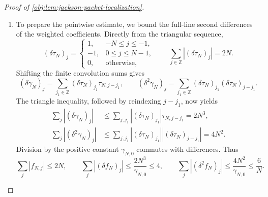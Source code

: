 \begin{proof}[Proof of \cref{obj:lem:jackson-packet-localization}]
\begin{enumerate}
\item To prepare the pointwise estimate, we bound the full-line second differences of the weighted coefficients. Directly from the triangular sequence,
\[
(\delta\tau_N)_j=
\begin{cases}
1,&-N\leq j\leq-1,\\
-1,&0\leq j\leq N-1,\\
0,&\text{otherwise},
\end{cases}
\qquad
\sum_{j\in\mathbb Z}|(\delta\tau_N)_j|=2N.
\]
Shifting the finite convolution sums gives
\[
(\delta\gamma_N)_j
=\sum_{j_1\in\mathbb Z}
(\delta\tau_N)_{j_1}\tau_{N,j-j_1},
\qquad
(\delta^2\gamma_N)_j
=\sum_{j_1\in\mathbb Z}
(\delta\tau_N)_{j_1}(\delta\tau_N)_{j-j_1}.
\]
The triangle inequality, followed by reindexing \(j-j_1\), now yields
\[
\begin{aligned}
\sum_j|(\delta\gamma_N)_j|
&\leq
\sum_{j,j_1}|(\delta\tau_N)_{j_1}|\tau_{N,j-j_1}
=2N^3,\\
\sum_j|(\delta^2\gamma_N)_j|
&\leq
\sum_{j,j_1}|(\delta\tau_N)_{j_1}|
                 |(\delta\tau_N)_{j-j_1}|
=4N^2.
\end{aligned}
\]
Division by the positive constant \(\gamma_{N,0}\) commutes with differences. Thus
\[
\sum_j|f_{N,j}|\leq2N,\qquad
\sum_j|(\delta f_N)_j|
\leq\frac{2N^3}{\gamma_{N,0}}\leq4,\qquad
\sum_j|(\delta^2f_N)_j|
\leq\frac{4N^2}{\gamma_{N,0}}\leq\frac6N.
\]


\end{enumerate}
\end{proof}
